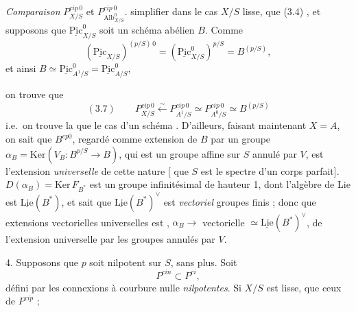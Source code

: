 \documentclass[11pt,a4paper]{article}
\begin{document}
\emph{Comparaison}  $P^{cip\,0}_{X/S}$ et $P^{cip\,0}_{\mathrm{Alb}^{0}_{X/S}}$.  simplifier dans le cas $X/S$ lisse,  que (3.4) , et supposons que $\underline{\mathrm{Pic}}^{0}_{X/S}$ soit un schéma abélien $B$. Comme \ill{} 
\[
(\underline{\mathrm{Pic}}_{X/S})^{(p/S)\,0} = (\underline{\mathrm{Pic}}^{0}_{X/S})^{p/S} = B^{(p/S)},
\]
\struck{\ill{}} et  ainsi $B \simeq \underline{\mathrm{Pic}}^{0}_{A^{1}/S} = \underline{\mathrm{Pic}}^{0}_{A/S}$,

on trouve que
\[
(3.7) \qquad P^{cip\,0}_{X/S} \xleftarrow{\sim} P^{cip\,0}_{A^{1}/S} \simeq P^{cip\,0}_{A^{0}/S} \simeq B^{(p/S)}
\]
i.e.\ on trouve la   que  le cas d'un schéma .  D'ailleurs, faisant maintenant $X = A$, on sait que $B^{cp0}$, regardé comme extension de $B$ par un groupe  $\alpha_{B} = \mathrm{Ker}(V_{B} : B^{p/S} \to B)$, qui est un groupe affine sur $S$ annulé par $V$, est l'extension \emph{universelle} de cette nature [ que $S$ est le spectre d'un corps parfait].  $D(\alpha_{B}) = \mathrm{Ker}\, F_{B^{*}}$  est un groupe infinitésimal de hauteur 1, dont l'algèbre de Lie est $\underline{\mathrm{Lie}}(B^{*})$, et  sait que $\underline{\mathrm{Lie}}(B^{*})^{\vee}$ est \ill{} \emph{} \emph{vectoriel}  groupes finis ; donc \ill{}  que \ill{} extensions vectorielles universelles est ,  $\alpha_{B} \to$  vectorielle $\simeq \underline{\mathrm{Lie}}(B^{*})^{\vee}$, de l'extension universelle par les groupes annulés par $V$.

4. Supposons que $p$ soit nilpotent sur $S$, sans plus. Soit
\[
P^{cin} \subset P^{ci},
\]
défini par les connexions à courbure nulle \emph{nilpotentes}. Si $X/S$ est lisse,      que \struck{\ill{}} ceux de $P^{cip}$ ;  
\end{document}
